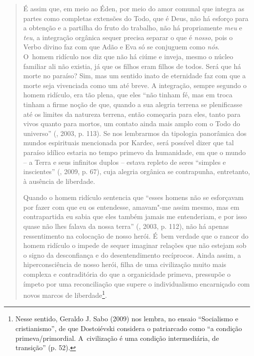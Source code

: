 {\begin{quote}
É assim que, em meio ao Éden, por meio do amor comunal que integra as
partes como completas extensões do Todo, que é Deus, não há esforço para
a obtenção e a partilha do fruto do trabalho, não há propriamente
\emph{meu} e \emph{teu}, a integração orgânica sequer precisa separar o
que é \emph{nosso}, pois o Verbo divino faz com que Adão e Eva só se
conjuguem como \emph{nós}. O~homem ridículo nos diz que não há ciúme e
inveja, mesmo o núcleo familiar ali não existia, já que os filhos eram
filhos de todos. Será que há morte no paraíso? Sim, mas um sentido inato
de eternidade faz com que a morte seja vivenciada como um até breve. A
integração, sempre segundo o homem ridículo, era tão plena, que eles
``não tinham fé, mas em troca tinham a firme noção de que, quando a sua
alegria terrena se plenificasse até os limites da natureza terrena,
então começaria para eles, tanto para vivos quanto para mortos, um
contato ainda mais amplo com o Todo do universo'' (, 2003, p.
113). Se nos lembrarmos da tipologia panorâmica dos mundos espirituais
mencionada por Kardec, será possível dizer que tal paraíso idílico
estaria no tempo primevo da humanidade, em que o mundo -- a Terra e seus
infinitos duplos -- estava repleto de seres ``simples e inscientes''
(, 2009, p. 67), cuja alegria orgânica se contrapunha, entretanto,
à ausência de liberdade.

Quando o homem ridículo sentencia que ``esses homens não se esforçavam
por fazer com que eu os entendesse, amavam"-me assim mesmo, mas em
contrapartida eu sabia que eles também jamais me entenderiam, e por isso
quase não lhes falava da nossa terra'' (, 2003, p. 112), não
há apenas ressentimento na colocação de nosso herói. É~bem verdade que o
rancor do homem ridículo o impede de sequer imaginar relações que não
estejam sob o signo da desconfiança e do desentendimento recíprocos.
Ainda assim, a hiperconsciência de nosso herói, filha de uma civilização
muito mais complexa e contraditória do que a organicidade primeva,
pressupõe o ímpeto por uma reconciliação que supere o individualismo
encarniçado com novos marcos de liberdade\footnote{Nesse sentido,
  Geraldo J. Sabo (2009) nos lembra, no ensaio ``Socialismo e
  cristianismo'', de que Dostoiévski considera o patriarcado como ``a
  condição primeva/primordial. A~civilização é uma condição
  intermediária, de transição'' (p. 52).}.


\end{quote}}
